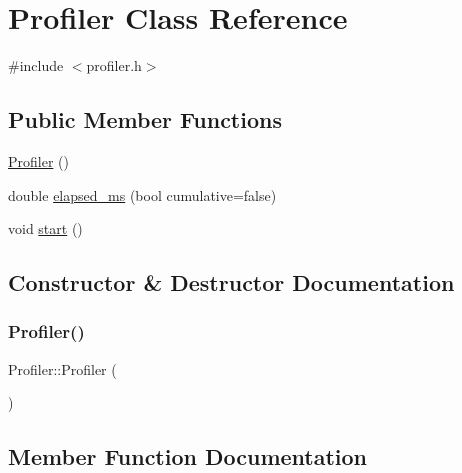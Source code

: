 \hypertarget{class_profiler}{}\section{Profiler Class Reference}
\label{class_profiler}


{\ttfamily \#include $<$profiler.\+h$>$}

\subsection*{Public Member Functions}
\begin{DoxyCompactItemize}
\item 
\mbox{\hyperlink{class_profiler_a675ebc9207b9aeace1d967c085abeacf}{Profiler}} ()
\item 
double \mbox{\hyperlink{class_profiler_a3422804e7007e765cfecbc29190db0a3}{elapsed\+\_\+ms}} (bool cumulative=false)
\item 
void \mbox{\hyperlink{class_profiler_a550862878d592d4c7e34a429db84b372}{start}} ()
\end{DoxyCompactItemize}


\subsection{Constructor \& Destructor Documentation}
\mbox{\label{class_profiler_a675ebc9207b9aeace1d967c085abeacf}} 
\subsubsection{\texorpdfstring{Profiler()}{Profiler()}}
{\footnotesize\ttfamily Profiler\+::\+Profiler (\begin{DoxyParamCaption}{ }\end{DoxyParamCaption})\hspace{0.3cm}{\ttfamily [inline]}}



\subsection{Member Function Documentation}
\mbox{\label{class_profiler_a3422804e7007e765cfecbc29190db0a3}} 
